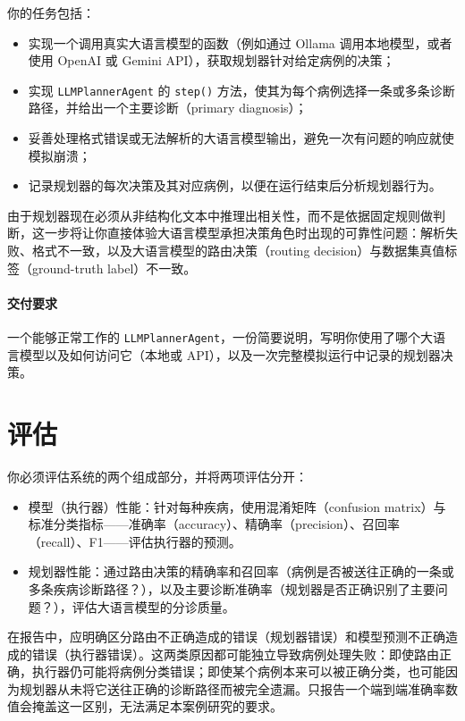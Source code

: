 你的任务包括：
\begin{itemize}
    \item 实现一个调用真实大语言模型的函数（例如通过 Ollama 调用本地模型，或者使用 OpenAI 或 Gemini API），获取规划器针对给定病例的决策；
    \item 实现 \texttt{LLMPlannerAgent} 的 \texttt{step()} 方法，使其为每个病例选择一条或多条诊断路径，并给出一个主要诊断（primary diagnosis）；
    \item 妥善处理格式错误或无法解析的大语言模型输出，避免一次有问题的响应就使模拟崩溃；
    \item 记录规划器的每次决策及其对应病例，以便在运行结束后分析规划器行为。
\end{itemize}
由于规划器现在必须从非结构化文本中推理出相关性，而不是依据固定规则做判断，这一步将让你直接体验大语言模型承担决策角色时出现的可靠性问题：解析失败、格式不一致，以及大语言模型的路由决策（routing decision）与数据集真值标签（ground-truth label）不一致。

\paragraph{交付要求} 一个能够正常工作的 \texttt{LLMPlannerAgent}，一份简要说明，写明你使用了哪个大语言模型以及如何访问它（本地或 API），以及一次完整模拟运行中记录的规划器决策。


\section{评估}
\label{sec:case3-evaluation}

你必须评估系统的两个组成部分，并将两项评估分开：

\begin{itemize}
    \item 模型（执行器）性能：针对每种疾病，使用混淆矩阵（confusion matrix）与标准分类指标——准确率（accuracy）、精确率（precision）、召回率（recall）、F1——评估执行器的预测。
    \item 规划器性能：通过路由决策的精确率和召回率（病例是否被送往正确的一条或多条疾病诊断路径？），以及主要诊断准确率（规划器是否正确识别了主要问题？），评估大语言模型的分诊质量。
\end{itemize}
在报告中，应明确区分路由不正确造成的错误（规划器错误）和模型预测不正确造成的错误（执行器错误）。这两类原因都可能独立导致病例处理失败：即使路由正确，执行器仍可能将病例分类错误；即使某个病例本来可以被正确分类，也可能因为规划器从未将它送往正确的诊断路径而被完全遗漏。只报告一个端到端准确率数值会掩盖这一区别，无法满足本案例研究的要求。


